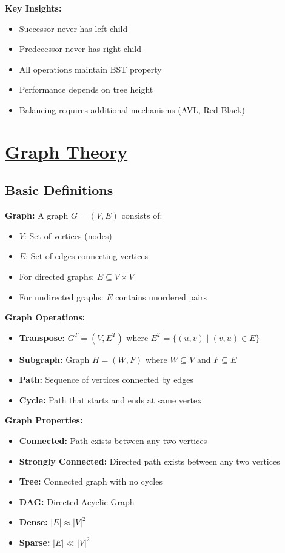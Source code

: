 \textbf{Key Insights:}
\begin{itemize}[noitemsep,leftmargin=*]
    \item Successor never has left child
    \item Predecessor never has right child
    \item All operations maintain BST property
    \item Performance depends on tree height
    \item Balancing requires additional mechanisms (AVL, Red-Black)
\end{itemize}

\clearpage
\section{\texorpdfstring{\underline{Graph Theory}}{Graph Theory}}
\subsection{Basic Definitions}
\textbf{Graph:} A graph $G = (V,E)$ consists of:
\begin{itemize}[noitemsep]
    \item $V$: Set of vertices (nodes)
    \item $E$: Set of edges connecting vertices
    \item For directed graphs: $E \subseteq V \times V$
    \item For undirected graphs: $E$ contains unordered pairs
\end{itemize}

\textbf{Graph Operations:}
\begin{itemize}[noitemsep]
    \item \textbf{Transpose:} $G^T = (V,E^T)$ where $E^T = \{(u,v) \mid (v,u) \in E\}$
    \item \textbf{Subgraph:} Graph $H = (W,F)$ where $W \subseteq V$ and $F \subseteq E$
    \item \textbf{Path:} Sequence of vertices connected by edges
    \item \textbf{Cycle:} Path that starts and ends at same vertex
\end{itemize}

\textbf{Graph Properties:}
\begin{itemize}[noitemsep]
    \item \textbf{Connected:} Path exists between any two vertices
    \item \textbf{Strongly Connected:} Directed path exists between any two vertices
    \item \textbf{Tree:} Connected graph with no cycles
    \item \textbf{DAG:} Directed Acyclic Graph
    \item \textbf{Dense:} $|E| \approx |V|^2$
    \item \textbf{Sparse:} $|E| \ll |V|^2$
\end{itemize}

